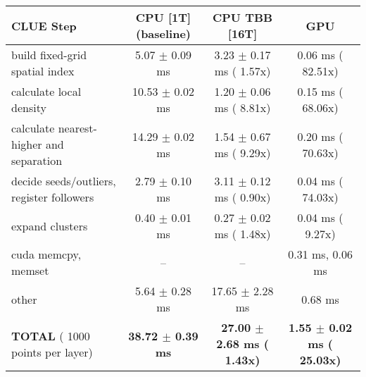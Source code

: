     \begin{tabular}{l|c|c|c}
    \hline
    CLUE Step                                 & CPU [1T] (baseline)         & CPU TBB [16T]                         & GPU                       \\ \hline
    build fixed-grid spatial index            &   5.07 $\pm$  0.09 ms       &   3.23 $\pm$  0.17 ms ( 1.57x)        &   0.06 ms ( 82.51x)       \\
    calculate local density                   &  10.53 $\pm$  0.02 ms       &   1.20 $\pm$  0.06 ms ( 8.81x)        &   0.15 ms ( 68.06x)       \\
    calculate nearest-higher and separation   &  14.29 $\pm$  0.02 ms       &   1.54 $\pm$  0.67 ms ( 9.29x)        &   0.20 ms ( 70.63x)       \\
    decide seeds/outliers, register followers &   2.79 $\pm$  0.10 ms       &   3.11 $\pm$  0.12 ms ( 0.90x)        &   0.04 ms ( 74.03x)       \\
    expand clusters                           &   0.40 $\pm$  0.01 ms       &   0.27 $\pm$  0.02 ms ( 1.48x)        &   0.04 ms (  9.27x)       \\ \hline
    cuda memcpy, memset                       & --                          & --                                    &   0.31 ms,   0.06 ms      \\ 
    other                                     &   5.64 $\pm$  0.28 ms       &  17.65 $\pm$  2.28 ms                 &   0.68 ms                 \\ \hline
    \textbf{TOTAL} ( 1000 points per layer)   & \textbf{ 38.72 $\pm$  0.39 ms} & \textbf{ 27.00 $\pm$  2.68 ms ( 1.43x)} & \textbf{  1.55 $\pm$  0.02 ms ( 25.03x)}  \\
    \hline 
    \end{tabular}
    \linebreak


